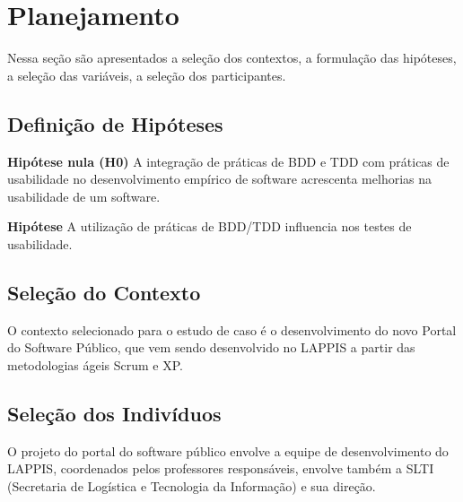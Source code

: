 

\section{Planejamento}

Nessa seção são apresentados a seleção dos contextos, a formulação das hipóteses, a seleção das variáveis, a seleção dos participantes.

\subsection{Definição de Hipóteses}

\textbf{Hipótese nula (H0)} A integração de práticas de BDD e TDD com práticas de usabilidade no desenvolvimento empírico de software acrescenta melhorias na usabilidade de um software.

\textbf{Hipótese} A utilização de práticas de BDD/TDD influencia nos testes de usabilidade.


\subsection{Seleção do Contexto}

O contexto selecionado para o estudo de caso é o desenvolvimento do novo Portal do Software Público, que vem sendo desenvolvido no LAPPIS a partir das metodologias ágeis Scrum e XP.		


\subsection{Seleção dos Indivíduos}

O projeto do portal do software público envolve a equipe de desenvolvimento do LAPPIS, coordenados pelos professores responsáveis, envolve também a SLTI (Secretaria de Logística e Tecnologia da Informação) e sua direção.

